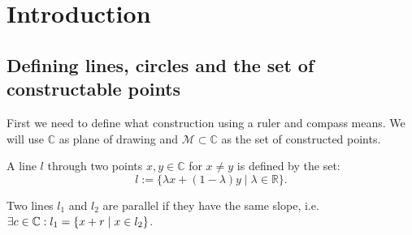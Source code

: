\chapter{Introduction}

\section{Defining lines, circles and the set of constructable points}
First we need to define what construction using a ruler and compass means.
We will use $\mathbb{C}$ as plane of drawing and $\mathcal{M} \subset \mathbb{C}$ as the set of constructed points.

\begin{definition}[Line]
    \label{def:line}
    \leanok
    A line $l$ through two points $x,y\in\mathbb{C}$ for $x\ne y$ is defined by the set: $$l:=\{\lambda x+(1-\lambda)y\mid\lambda\in\mathbb{R}\}.$$
\end{definition}

\begin{definition}[parallel]
    \label{def:parallel}
    \leanok
    Two lines $l_1$ and $l_2$ are parallel if they have the same slope, i.e. $\exists c\in\mathbb{C}: l_1 = \{x + r \mid x\in l_2\}$.
\end{definition}

